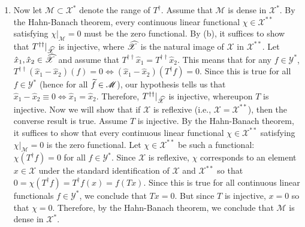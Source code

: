 \documentclass{article}
\begin{document}
\begin{enumerate}[itemsep =-2pt,label = (\alph{*})]
		\item Now let $\mathscr{M} \subset \mathscr{X}^{\ast}$ denote the range of $T^{\dagger}$. Assume that $\mathscr{M}$ is dense in $\mathscr{X}^{\ast}$. By the Hahn-Banach theorem, every continuous linear functional $\chi \in \mathscr{X}^{\ast\ast}$ satisfying $\chi|_{\mathscr{M}} = 0$ must be the zero functional. By (b), it suffices to show that $T^{\dagger\dagger}|_{\widehat{\mathscr{X}}}$ is injective, where $\widehat{\mathscr{X}}$ is the natural image of $\mathscr{X}$ in $\mathscr{X}^{\ast\ast}$. Let $\hat{x}_{1}, \hat{x}_{2} \in \widehat{\mathscr{X}}$ and assume that $T^{\dagger\dagger}\hat{x}_{1} = T^{\dagger\dagger}\hat{x}_{2}$. This means that for any $f \in \mathscr{Y}^{\ast}$, $T^{\dagger\dagger}(\hat{x}_{1} - \hat{x}_{2})(f) = 0 \iff (\hat{x}_{1} - \hat{x}_{2})(T^{\dagger}f) = 0$. Since this is true for all $f \in \mathscr{Y}^{\ast}$ (hence for all $\widetilde{f} \in \mathscr{M}$), our hypothesis tells us that $\hat{x}_{1} - \hat{x}_{2} \equiv 0 \iff \hat{x}_{1} = \hat{x}_{2}$. Therefore, $T^{\dagger\dagger}|_{\widehat{\mathscr{X}}}$ is injective, whereupon $T$ is injective.  Now we will show that if $\mathscr{X}$ is reflexive (i.e., $\mathscr{X} = \mathscr{X}^{\ast\ast}$), then the converse result is true. Assume $T$ is injective. By the Hahn-Banach theorem, it suffices to show that every continuous linear functional $\chi \in \mathscr{X}^{\ast\ast}$ satisfying $\chi|_{\mathscr{M}} = 0$ is the zero functional. Let $\chi \in \mathscr{X}^{\ast\ast}$ be such a functional: $\chi(T^{\dagger}f) = 0$ for all $f \in \mathscr{Y}^{\ast}$. Since $\mathscr{X}$ is reflexive, $\chi$ corresponds to an element $x \in \mathscr{X}$ under the standard identification of $\mathscr{X}$ and $\mathscr{X}^{\ast\ast}$ so that $0 = \chi(T^{\dagger}f) = T^{\dagger}f(x) = f(Tx)$. Since this is true for all continuous linear functionals $f \in \mathscr{Y}^{\ast}$, we conclude that $Tx =0$. But since $T$ is injective, $x = 0$ so that $\chi = 0$. Therefore, by the Hahn-Banach theorem, we conclude that $\mathscr{M}$ is dense in $\mathscr{X}^{\ast}$. 
	\end{enumerate}
	
\end{document}
